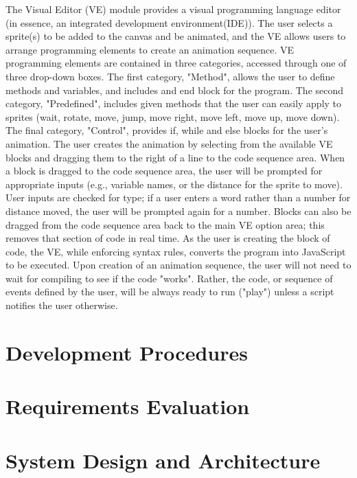 \documentclass[a4paper]{article}
\begin{document}
The Visual Editor (VE) module provides a visual programming language editor (in essence, an integrated development environment(IDE)).  The user selects a sprite(s) to be added to the canvas and be animated, and the VE allows users to arrange programming elements to create an animation sequence.  VE programming elements are contained in three categories, accessed through one of three drop-down boxes.  The first category, "Method", allows the user to define methods and variables, and includes and end block for the program.  The second category, "Predefined", includes given methods that the user can easily apply to sprites (wait, rotate, move, jump, move right, move left, move up, move down).  The final category, "Control", provides if, while and else blocks for the user's animation.  The user creates the animation by selecting from the available VE blocks and dragging them to the right of a line to the code sequence area.  When a block is dragged to the code sequence area, the user will be prompted for appropriate inputs (e.g., variable names, or the distance for the sprite to move).  User inputs are checked for type; if a user enters a word rather than a number for distance moved, the user will be prompted again for a number.  Blocks can also be dragged from the code sequence area back to the main VE option area; this removes that section of code in real time. As the user is creating the block of code, the VE, while enforcing syntax rules, converts the program into JavaScript to be executed.  Upon creation of an animation sequence, the user will not need to  wait for compiling to see if the code "works". Rather, the code, or sequence of events defined by the user, will be always ready to run ("play") unless a script notifies the user otherwise.






\section{Development Procedures}



\section{Requirements Evaluation}



\section{System Design and Architecture}
\end{document}
